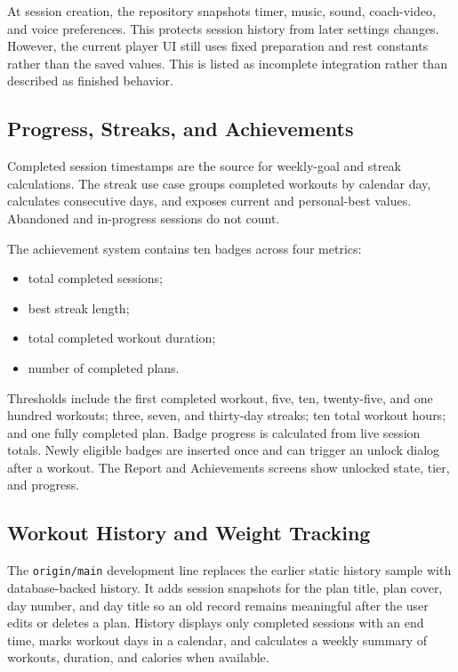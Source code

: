 At session creation, the repository snapshots timer, music, sound, coach-video, and voice preferences. This protects session history from later settings changes. However, the current player UI still uses fixed preparation and rest constants rather than the saved values. This is listed as incomplete integration rather than described as finished behavior.

\subsection{Progress, Streaks, and Achievements}

Completed session timestamps are the source for weekly-goal and streak calculations. The streak use case groups completed workouts by calendar day, calculates consecutive days, and exposes current and personal-best values. Abandoned and in-progress sessions do not count.

The achievement system contains ten badges across four metrics:

\begin{itemize}
    \item total completed sessions;
    \item best streak length;
    \item total completed workout duration;
    \item number of completed plans.
\end{itemize}

Thresholds include the first completed workout, five, ten, twenty-five, and one hundred workouts; three, seven, and thirty-day streaks; ten total workout hours; and one fully completed plan. Badge progress is calculated from live session totals. Newly eligible badges are inserted once and can trigger an unlock dialog after a workout. The Report and Achievements screens show unlocked state, tier, and progress.

\subsection{Workout History and Weight Tracking}

The \texttt{origin/main} development line replaces the earlier static history sample with database-backed history. It adds session snapshots for the plan title, plan cover, day number, and day title so an old record remains meaningful after the user edits or deletes a plan. History displays only completed sessions with an end time, marks workout days in a calendar, and calculates a weekly summary of workouts, duration, and calories when available.

